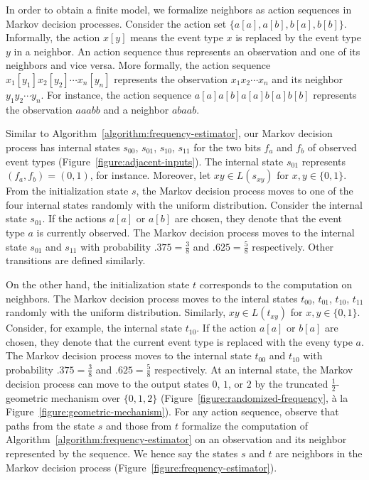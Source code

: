 In order to obtain a finite model, we formalize neighbors as action
sequences in Markov decision processes. Consider the action set $\{
a[a], a[b], b[a], b[b] \}$. Informally, the action $x[y]$ means the
event type $x$ is replaced by the event type $y$ in a neighbor. An
action sequence thus represents an observation and one of its
neighbors and vice versa. More formally, the action sequence
$x_1[y_1]x_2[y_2]\cdots x_n[y_n]$ represents the observation
$x_1x_2\cdots x_n$ and its neighbor $y_1y_2\cdots y_n$. For instance,
the action sequence $a[a]a[b]a[a]b[a]b[b]$ represents the observation
$aaabb$ and a neighbor $abaab$.

Similar to Algorithm~\ref{algorithm:frequency-estimator}, our Markov
decision process has internal states $s_{00}$, $s_{01}$, $s_{10}$,
$s_{11}$ for the two bits $f_a$ and $f_b$ of observed event types
(Figure~\ref{figure:adjacent-inputs}). The internal state $s_{01}$
represents $(f_a, f_b) = (0, 1)$, for instance. Moreover, let $xy \in
L (s_{xy})$ for $x, y \in \{ 0, 1 \}$. From the
initialization state $s$, the Markov decision process moves to one of
the four internal states randomly with the uniform
distribution. Consider the internal state $s_{01}$. If the actions $a[a]$
or $a[b]$ are chosen, they denote that the event type $a$ is currently
observed. The Markov decision process moves to the internal state $s_{01}$
and $s_{11}$ with probability $.375 = \frac{3}{8}$ and $.625 =
\frac{5}{8}$ respectively. Other transitions are defined similarly.

On the other hand, the initialization state $t$
corresponds to the computation on neighbors. The Markov decision
process moves to the interal states $t_{00}$,
$t_{01}$, $t_{10}$, $t_{11}$ randomly with
the uniform distribution. Similarly, $xy \in L (t_{xy})$ for $x, y \in
\{ 0, 1 \}$.
Consider, for example, the internal state
$t_{10}$. If the action $a[a]$ or $b[a]$ are chosen, they
denote that the current event type is replaced with the eveny type
$a$. The Markov decision process moves to the internal state
$t_{00}$ and $t_{10}$ with probability $.375 =
\frac{3}{8}$ and $.625 = \frac{5}{8}$ respectively. At an internal
state, the Markov decision process can move to the output states $0$,
$1$, or $2$ by the truncated $\frac{1}{2}$-geometric mechanism over
$\{ 0, 1, 2 \}$ (Figure~\ref{figure:randomized-frequency}, \`{a} la
Figure~\ref{figure:geometric-mechanism}). For any action sequence,
observe that paths from the state $s$ and those from $t$
formalize the computation of Algorithm~\ref{algorithm:frequency-estimator}
on an observation and its neighbor represented by the sequence. We
hence say the states $s$ and $t$ are neighbors in the
Markov decision process (Figure~\ref{figure:frequency-estimator}).

